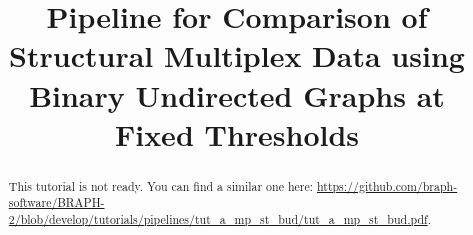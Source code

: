 \documentclass[justified]{tufte-handout}
\title[Comparison of Structural Multiplex Data using WU]{Pipeline for Comparison of Structural Multiplex Data using Binary Undirected Graphs at Fixed Thresholds}
\begin{document}
\maketitle

\begin{abstract}
\noindent
This tutorial is not ready. You can find a similar one here: \url{https://github.com/braph-software/BRAPH-2/blob/develop/tutorials/pipelines/tut_a_mp_st_bud/tut_a_mp_st_bud.pdf}.
\end{abstract}
\end{document}
